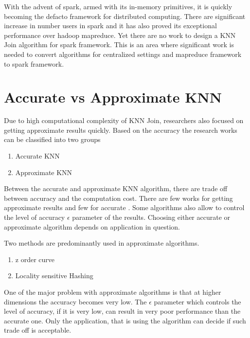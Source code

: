 With the advent of spark, armed with its in-memory primitives, it is quickly becoming the defacto framework for
distributed computing. There are significant increase in number users
in spark and it has also proved its exceptional performance over
hadoop mapreduce. Yet there are no work to design a KNN Join algorithm
for spark framework. This is an area where significant
work is needed to convert algorithms for centralized settings and mapreduce framework  to spark
framework.

\section{Accurate vs Approximate KNN}

Due to high computational complexity of KNN Join, researchers
also focused on getting approximate results quickly. Based on the accuracy the
research works can be classified into two groups
\begin{enumerate}
\item Accurate KNN
\item Approximate KNN
\end{enumerate}


Between the accurate and approximate KNN algorithm, there are trade
off between accuracy and the computation cost. There are few
works for getting approximate results \cite{stupar_rankreduceprocessing_2010}
\cite{zhang_efficient_2012} and few for accurate
\cite{jagadish_idistance:_2005} \cite{xia_gorder:_2004}
\cite{lu_efficient_2012}. Some algorithms also allow to control the
level of accuracy $\epsilon$  parameter of the results. Choosing
either accurate or approximate algorithm depends on
application in question.

\medskip

Two methods are predominantly
used in approximate algorithms.
\begin{enumerate}
\item z order curve
\item Locality sensitive Hashing
\end{enumerate}

\medskip

One of the major problem with approximate algorithms is that at higher
dimensions the accuracy becomes very low. The $\epsilon$ parameter which
controls the level of accuracy, if it is very low, can result in very
poor performance than the accurate one. Only the application, that is
using the algorithm can decide if such trade off is acceptable.

